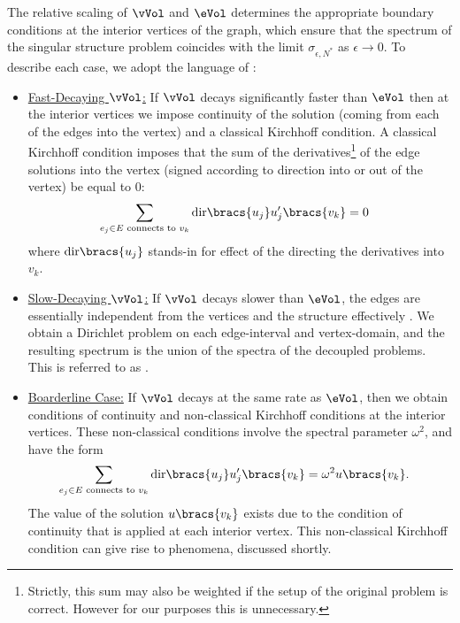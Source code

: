 The relative scaling of $\vVol$ and $\eVol$ determines the appropriate boundary conditions at the interior vertices of the graph, which ensure that the spectrum of the singular structure problem coincides with the limit $\sigma_{\epsilon, N^{*}}$ as $\epsilon\rightarrow0$.
To describe each case, we adopt the language of \cite{exner2005convergence}:
\begin{itemize}
	\item \underline{Fast-Decaying $\vVol$:} If $\vVol$ decays significantly faster than $\eVol$ then at the interior vertices we impose continuity of the solution (coming from each of the edges into the vertex) and a classical Kirchhoff condition. 
	A classical Kirchhoff condition imposes that the sum of the derivatives\footnote{Strictly, this sum may also be weighted if the setup of the original problem is correct. 
	However for our purposes this is unnecessary.} of the edge solutions into the vertex (signed according to direction into or out of the vertex) be equal to 0:
	\begin{align*}
		\sum_{e_{j}\in E \text{ connects to } v_{k}} \mathrm{dir}\bracs{u_{j}}u_{j}^{\prime}\bracs{v_{k}} &= 0
	\end{align*}
	where $\mathrm{dir}\bracs{u_{j}}$ stands-in for effect of the directing the derivatives into $v_{k}$.
	\item \underline{Slow-Decaying $\vVol$:} If $\vVol$ decays slower than $\eVol$, the edges are essentially independent from the vertices and the structure effectively . 
	We obtain a Dirichlet problem on each edge-interval and vertex-domain, and the resulting spectrum is the union of the spectra of the decoupled problems. 
	This is referred to as .
	\item \underline{Boarderline Case:} If $\vVol$ decays at the same rate as $\eVol$, then we obtain conditions of continuity and non-classical Kirchhoff conditions at the interior vertices.
	These non-classical conditions involve the spectral parameter $\omega^{2}$, and have the form
	\begin{align*}
		\sum_{e_{j}\in E \text{ connects to } v_{k}} \mathrm{dir}\bracs{u_{j}}u_{j}^{\prime}\bracs{v_{k}} &= \omega^{2}u\bracs{v_{k}}.
	\end{align*}
	The value of the solution $u\bracs{v_{k}}$ exists due to the condition of continuity that is applied at each interior vertex.
	This non-classical Kirchhoff condition can give rise to  phenomena, discussed shortly.
\end{itemize}
